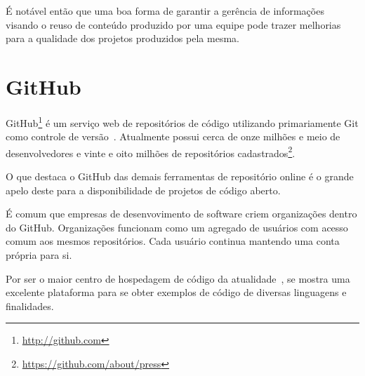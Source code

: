 É notável então que uma boa forma de garantir a gerência de informações visando o reuso de conteúdo produzido por uma equipe pode trazer melhorias para a qualidade dos projetos produzidos pela mesma.

\section{GitHub}

GitHub\footnote{\url{http://github.com}} é um serviço web de repositórios de código utilizando primariamente Git como controle de versão~\cite{Figueira2015}. Atualmente possui cerca de onze milhões e meio de desenvolvedores e vinte e oito milhões de repositórios cadastrados\footnote{\url{https://github.com/about/press}}.

O que destaca o GitHub das demais ferramentas de repositório online é o grande apelo deste para a disponibilidade de projetos de código aberto.

É comum que empresas de desenvovimento de software criem organizações dentro do GitHub. Organizações funcionam como um agregado de usuários com acesso comum aos mesmos repositórios. Cada usuário continua mantendo uma conta própria para si.

Por ser o maior centro de hospedagem de código da atualidade~\cite{Gousios2012}, se mostra uma excelente plataforma para se obter exemplos de código de diversas linguagens e finalidades.

